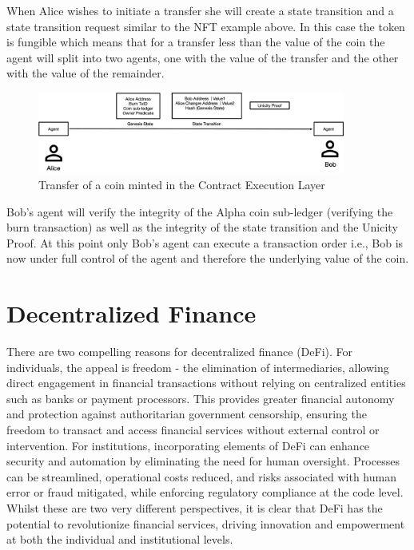 \documentclass{article}
\begin{document}
When Alice wishes to initiate a transfer she will create a state transition and a state transition request similar to the NFT example above. In this case the token is fungible which means that for a transfer less than the value of the coin the agent will split into two agents, one with the value of the transfer and the other with the value of the remainder.

\begin{figure}[H]
    \centering
    \includegraphics[width=0.9\textwidth]{Alice-Transfer.png}
    \caption{Transfer of a coin minted in the Contract Execution Layer}
    \label{fig:Alice Transfer}
\end{figure}


Bob's agent will verify the integrity of the Alpha coin sub-ledger (verifying the burn transaction) as well as the integrity of the state transition and the Unicity Proof. At this point only Bob's agent can execute a transaction order i.e., Bob is now under full control of the agent and therefore the underlying value of the coin.

\section{Decentralized Finance}

There are two compelling reasons for decentralized finance (DeFi). For individuals, the appeal is freedom - the elimination of intermediaries, allowing direct engagement in financial transactions without relying on centralized entities such as banks or payment processors. This provides greater financial autonomy and protection against authoritarian government censorship, ensuring the freedom to transact and access financial services without external control or intervention. For institutions, incorporating elements of DeFi can enhance security and automation by eliminating the need for human oversight. Processes can be streamlined, operational costs reduced, and risks associated with human error or fraud mitigated, while enforcing regulatory compliance at the code level. Whilst these are two very different perspectives, it is clear that DeFi has the potential to revolutionize financial services, driving innovation and empowerment at both the individual and institutional levels.
\end{document}
